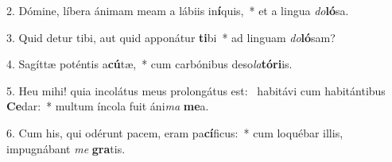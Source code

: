 2. Dómine, líbera ánimam meam a lábiis in\textbf{í}quis,~*  et a lingua \textit{do}\textbf{ló}sa.\

3. Quid detur tibi, aut quid apponátur \textbf{ti}bi~*  ad linguam \textit{do}\textbf{ló}sam?\

4. Sagíttæ poténtis a\textbf{cú}tæ,~*  cum carbónibus deso\textit{la}\textbf{tó}\textbf{ri}is.\

5. Heu mihi! quia incolátus meus prolongátus est: \dag\  habitávi cum habitántibus \textbf{Ce}dar:~*  multum íncola fuit áni\textit{ma} \textbf{me}a.\

6. Cum his, qui odérunt pacem, eram pa\textbf{cí}ficus:~*  cum loquébar illis, impugnábant \textit{me} \textbf{gra}tis.\

